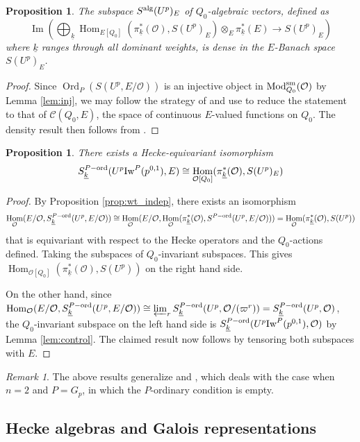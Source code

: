 \documentclass[leqno]{amsart}
\newcommand{\wt}[1]{\underline{ #1 }}
\newcommand{\Iw}{\textnormal{Iw}}
\DeclareMathOperator{\Mod}{\textnormal{Mod}}
\DeclareMathOperator{\Ord}{Ord}
\newcommand{\alg}{\textnormal{alg}}
\newcommand{\sm}{\textnormal{sm}}
\newcommand{\ord}{\textnormal{ord}}
\newcommand{\oo}{\mathcal{O}} %
\DeclareMathOperator{\Hom}{Hom}
\DeclareMathOperator{\Image}{Im}
\newtheorem{prop}[thm]{Proposition}
\theoremstyle{definition}
\theoremstyle{remark}
\newtheorem{rem}[thm]{Remark}
\begin{document}
\begin{prop}\label{prop:density}
The subspace $S^{\alg}(U^p)_E$ 
of $Q_0$-algebraic vectors, defined as
\[
\Image\left(\bigoplus_{\wt{k}}\Hom_{E[Q_0]}(\pi_{\wt{k}}^*(\oo), S(U^p)_E)
\otimes_E \pi_{\wt{k}}^*(E)\rightarrow S(U^p)_E\right)
\]
where $\wt{k}$ ranges through all dominant weights,
is dense in the $E$-Banach space $S(U^p)_E$.
\end{prop}
\begin{proof}
	Since $\Ord_P(S(U^p,E/\oo))$ is an injective object
	in $\Mod_{Q_0}^{\sm}(\oo)$
	by Lemma \ref{lem:inj},
	we may follow the strategy of 
	\cite[Prop 3.2.9]{pan}
	and use \cite[Cor 3.2.6]{pan}
	to reduce the statement to that of
	$\mathcal{C}(Q_0,E)$,
	the space of continuous  $E$-valued
	functions on $Q_0$.
	The density result then follows from
	\cite[Prop 6.A.17]{Pask14}.
\end{proof}


\begin{prop}\label{prop:wt_space}
	There exists a Hecke-equivariant isomorphism
	\[
	S_{\wt{k}}^{P-\ord}(U^p\Iw^P(p^{0,1}),E)\cong 
	\Hom_{\oo[Q_0]}(\pi_{\wt{k}}^*(\oo), S(U^p)_E)
	\]
\end{prop}
\begin{proof}
	By Proposition \ref{prop:wt_indep},
	there exists an isomorphism
	\[
		\Hom_\oo(E/\oo, S_{\wt{k}}^{P-\ord}(U^p,E/\oo))\cong 
		\Hom_\oo(E/\oo,
		\Hom_{\oo}(\pi_{\wt{k}}^*(\oo),
		S^{P-\ord}(U^p,E/\oo)))=
		\Hom_{\oo}(\pi_{\wt{k}}^*(\oo), S(U^p))
	\]
	that is equivariant with respect to 
	the Hecke operators and 
	the $Q_0$-actions defined.
	Taking the subspaces of $Q_0$-invariant subspaces.
	This gives
	$\Hom_{\oo[Q_0]}(\pi_{\wt{k}}^*(\oo), S(U^p))$
	on the right hand side.

	On the other hand, since
	$\Hom_\oo(E/\oo, S_{\wt{k}}^{P-\ord}(U^p,E/\oo))\cong
	\varprojlim_r S_{\wt{k}}^{P-\ord}(U^p,\oo/(\varpi^r))=
	S_{\wt{k}}^{P-\ord}(U^p,\oo)$,
	the $Q_0$-invariant subspace 
	on the left hand side
	is $S_{\wt{k}}^{P-\ord}(U^p\Iw^P(p^{0,1}),\oo)$
	by Lemma \ref{lem:control}.
	The claimed result now follows by
	tensoring both subspaces with $E$.
\end{proof}

\begin{rem}
	The above results generalize
	\cite[Prop 3.2.9]{pan} and 
	\cite[\S 3.2.10]{pan},
	which deals with the case 
	when $n=2$ and $P=G_p$,
	in which the $P$-ordinary condition is empty.
\end{rem}


\subsection{Hecke algebras and Galois representations}
\end{document}
